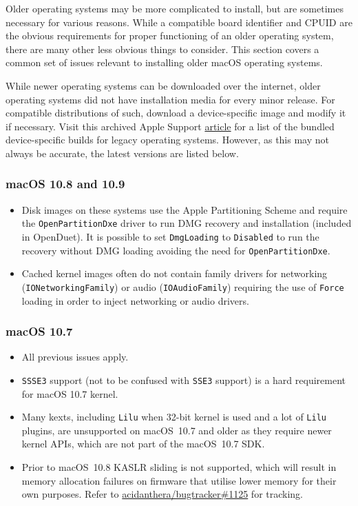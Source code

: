 \documentclass[]{article}
\begin{document}
Older operating systems may be more complicated to install, but are sometimes
necessary for various reasons. While a compatible board identifier
and CPUID are the obvious requirements for proper functioning of an older
operating system, there are many other less obvious things to consider.
This section covers a common set of issues relevant to installing
older macOS operating systems.

While newer operating systems can be downloaded over the internet,
older operating systems did not have installation media for every minor
release. For compatible distributions of such, download a device-specific
image and modify it if necessary. Visit this archived Apple Support
\href{https://web.archive.org/web/20170705003629/https://support.apple.com/en-us/HT204319}{article}
for a list of the bundled device-specific builds for legacy operating systems.
However, as this may not always be accurate, the latest versions are listed below.

\subsubsection{macOS 10.8 and 10.9}\label{legacy108}

\begin{itemize}
  \item Disk images on these systems use the Apple Partitioning Scheme
    and require the \texttt{OpenPartitionDxe} driver to run DMG recovery
    and installation (included in OpenDuet). It is possible to set
    \texttt{DmgLoading} to \texttt{Disabled} to run the recovery
    without DMG loading avoiding the need for \texttt{OpenPartitionDxe}.
  \item Cached kernel images often do not contain family drivers
    for networking (\texttt{IONetworkingFamily}) or audio
    (\texttt{IOAudioFamily}) requiring the use of \texttt{Force}
    loading in order to inject networking or audio drivers.
\end{itemize}

\subsubsection{macOS 10.7}\label{legacy107}

\begin{itemize}
  \item All previous issues apply.
  \item \texttt{SSSE3} support (not to be confused with \texttt{SSE3} support)
    is a hard requirement for macOS 10.7 kernel.
  \item Many kexts, including \texttt{Lilu} when 32-bit kernel
    is used and a lot of \texttt{Lilu} plugins, are
    unsupported on macOS~10.7 and older as they require newer
    kernel APIs, which are not part of the macOS~10.7 SDK.
  \item Prior to macOS~10.8 KASLR sliding is not supported, which
    will result in memory allocation failures on firmware
    that utilise lower memory for their own purposes. Refer to
    \href{https://github.com/acidanthera/bugtracker/issues/1125}{acidanthera/bugtracker\#1125}
    for tracking.
\end{itemize}
\end{document}
